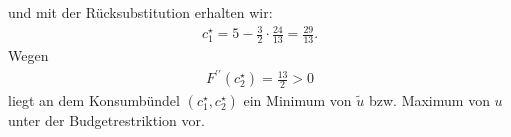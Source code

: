 und mit der Rücksubstitution erhalten wir:
\begin{align*}
	c_1^\star = 5 - \frac{3}{2} \cdot \frac{24}{13}
	= \frac{29}{13}.
\end{align*}
Wegen 
\begin{align*}
	F^{\prime \prime}(c_2^\star ) = \frac{13}{2} > 0
\end{align*}
liegt an dem Konsumbündel $(c^\star_1,c^\star_2)$ ein Minimum von $\tilde{u}$ bzw. Maximum von $u$ unter der Budgetrestriktion vor.


\newpage

